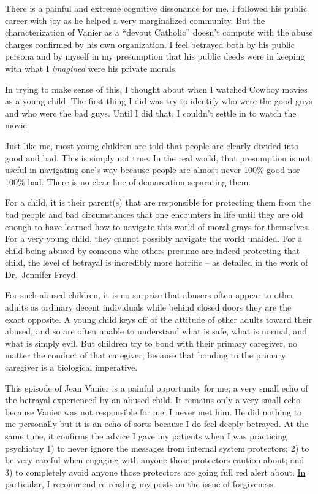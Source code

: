 \documentclass[]{book}
\begin{document}
There is a painful and extreme cognitive dissonance for me. I followed his public career with joy as he helped a very marginalized community. But the characterization of Vanier as a ``devout Catholic'' doesn't compute with the abuse charges confirmed by his own organization. I feel betrayed both by his public persona and by myself in my presumption that his public deeds were in keeping with what I \emph{imagined} were his private morals.

In trying to make sense of this, I thought about when I watched Cowboy movies as a young child. The first thing I did was try to identify who were the good guys and who were the bad guys. Until I did that, I couldn't settle in to watch the movie.

Just like me, most young children are told that people are clearly divided into good and bad. This is simply not true. In the real world, that presumption is not useful in navigating one's way because people are almost never 100\% good nor 100\% bad. There is no clear line of demarcation separating them.

For a child, it is their parent(s) that are responsible for protecting them from the bad people and bad circumstances that one encounters in life until they are old enough to have learned how to navigate this world of moral grays for themselves. For a very young child, they cannot possibly navigate the world unaided. For a child being abused by someone who others presume are indeed protecting that child, the level of betrayal is incredibly more horrific -- as detailed in the work of Dr.~Jennifer Freyd.

For such abused children, it is no surprise that abusers often appear to other adults as ordinary decent individuals while behind closed doors they are the exact opposite. A young child keys off of the attitude of other adults toward their abused, and so are often unable to understand what is safe, what is normal, and what is simply evil. But children try to bond with their primary caregiver, no matter the conduct of that caregiver, because that bonding to the primary caregiver is a biological imperative.

This episode of Jean Vanier is a painful opportunity for me; a very small echo of the betrayal experienced by an abused child. It remains only a very small echo because Vanier was not responsible for me: I never met him. He did nothing to me personally but it is an echo of sorts because I do feel deeply betrayed.
At the same time, it confirms the advice I gave my patients when I was practicing psychiatry 1) to never ignore the messages from internal system protectors; 2) to be very careful when engaging with anyone those protectors caution about; and 3) to completely avoid anyone those protectors are going full red alert about. \href{https://www.engagingmultiples.com/meaning-forgiveness-part-1/}{In particular, I recommend re-reading my posts on the issue of forgiveness}.
\end{document}
